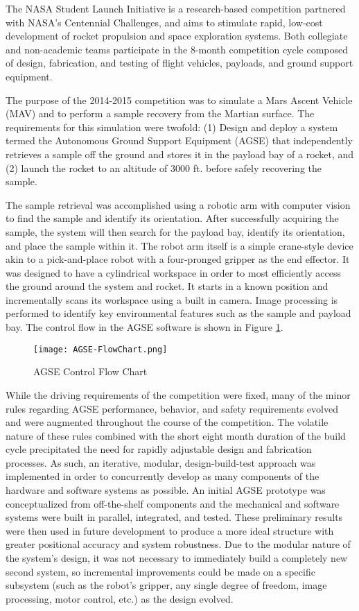 The NASA Student Launch Initiative \cite{NASA_SL} is a research-based
competition partnered with NASA's Centennial Challenges, and aims to
stimulate rapid, low-cost development of rocket propulsion and space
exploration systems.  Both collegiate and non-academic teams
participate in the 8-month competition cycle composed of design,
fabrication, and testing of flight vehicles, payloads, and ground
support equipment.

The purpose of the 2014-2015 competition was to simulate a Mars Ascent
Vehicle (MAV) and to perform a sample recovery from the Martian
surface. The requirements for this simulation were twofold: (1) Design
and deploy a system termed the Autonomous Ground Support Equipment
(AGSE) that independently retrieves a sample off the ground and stores
it in the payload bay of a rocket, and (2) launch the rocket to an
altitude of 3000 ft. before safely recovering the sample.

The sample retrieval was accomplished using a robotic arm with
computer vision to find the sample and identify its orientation. After
successfully acquiring the sample, the system will then search for the
payload bay, identify its orientation, and place the sample within it.
The robot arm itself is a simple crane-style device akin to a
pick-and-place robot with a four-pronged gripper as the end effector.
It was designed to have a cylindrical workspace in order to most
efficiently access the ground around the system and rocket. It starts
in a known position and incrementally scans its workspace using a
built in camera. Image processing is performed to identify key
environmental features such as the sample and payload bay.  The
control flow in the AGSE software is shown in Figure
\ref{fig:AGSE-FlowChart}.

\begin{figure}[h]
	\centering
	\texttt{[image: AGSE-FlowChart.png]}
	\caption{AGSE Control Flow Chart}
	\label{fig:AGSE-FlowChart}
\end{figure}
\FloatBarrier

While the driving requirements of the competition were fixed, many of
the minor rules regarding AGSE performance, behavior, and safety
requirements evolved and were augmented throughout the course of the
competition. The volatile nature of these rules combined with the
short eight month duration of the build cycle precipitated the need
for rapidly adjustable design and fabrication processes. As such, an
iterative, modular, design-build-test approach was implemented in
order to concurrently develop as many components of the hardware and
software systems as possible. An initial AGSE prototype was
conceptualized from off-the-shelf components and the mechanical and
software systems were built in parallel, integrated, and tested. These
preliminary results were then used in future development to produce a
more ideal structure with greater positional accuracy and system
robustness.  Due to the modular nature of the system's design, it was
not necessary to immediately build a completely new second system, so
incremental improvements could be made on a specific subsystem (such
as the robot's gripper, any single degree of freedom, image
processing, motor control, etc.) as the design evolved.

